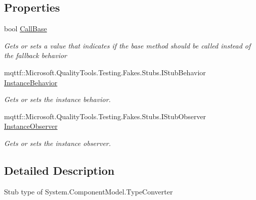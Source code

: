 \subsection*{Properties}
\begin{DoxyCompactItemize}
\item 
bool \hyperlink{class_system_1_1_component_model_1_1_fakes_1_1_stub_type_converter_a374c7283e95e7a79ec0587400d53cf5c}{Call\-Base}
\begin{DoxyCompactList}\small\item\em Gets or sets a value that indicates if the base method should be called instead of the fallback behavior\end{DoxyCompactList}\item 
mqttf\-::\-Microsoft.\-Quality\-Tools.\-Testing.\-Fakes.\-Stubs.\-I\-Stub\-Behavior \hyperlink{class_system_1_1_component_model_1_1_fakes_1_1_stub_type_converter_a7fcc33062606d567ff82f9735a570578}{Instance\-Behavior}
\begin{DoxyCompactList}\small\item\em Gets or sets the instance behavior.\end{DoxyCompactList}\item 
mqttf\-::\-Microsoft.\-Quality\-Tools.\-Testing.\-Fakes.\-Stubs.\-I\-Stub\-Observer \hyperlink{class_system_1_1_component_model_1_1_fakes_1_1_stub_type_converter_a7ed846151312c7353aa056bed462d27f}{Instance\-Observer}
\begin{DoxyCompactList}\small\item\em Gets or sets the instance observer.\end{DoxyCompactList}\end{DoxyCompactItemize}


\subsection{Detailed Description}
Stub type of System.\-Component\-Model.\-Type\-Converter



